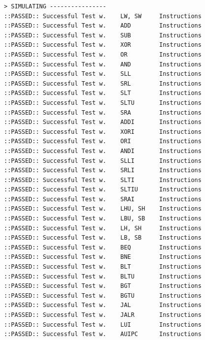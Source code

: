 \documentclass[12pt,a4paper,oneside]{book} %
\begin{document}
\begin{verbatim} 
> SIMULATING ----------------  
::PASSED:: Successful Test w.    LW, SW     Instructions
::PASSED:: Successful Test w.    ADD        Instructions
::PASSED:: Successful Test w.    SUB        Instructions
::PASSED:: Successful Test w.    XOR        Instructions
::PASSED:: Successful Test w.    OR         Instructions
::PASSED:: Successful Test w.    AND        Instructions
::PASSED:: Successful Test w.    SLL        Instructions
::PASSED:: Successful Test w.    SRL        Instructions
::PASSED:: Successful Test w.    SLT        Instructions
::PASSED:: Successful Test w.    SLTU       Instructions
::PASSED:: Successful Test w.    SRA        Instructions
::PASSED:: Successful Test w.    ADDI       Instructions
::PASSED:: Successful Test w.    XORI       Instructions
::PASSED:: Successful Test w.    ORI        Instructions
::PASSED:: Successful Test w.    ANDI       Instructions
::PASSED:: Successful Test w.    SLLI       Instructions
::PASSED:: Successful Test w.    SRLI       Instructions
::PASSED:: Successful Test w.    SLTI       Instructions
::PASSED:: Successful Test w.    SLTIU      Instructions
::PASSED:: Successful Test w.    SRAI       Instructions
::PASSED:: Successful Test w.    LHU, SH    Instructions
::PASSED:: Successful Test w.    LBU, SB    Instructions
::PASSED:: Successful Test w.    LH, SH     Instructions
::PASSED:: Successful Test w.    LB, SB     Instructions
::PASSED:: Successful Test w.    BEQ        Instructions
::PASSED:: Successful Test w.    BNE        Instructions
::PASSED:: Successful Test w.    BLT        Instructions
::PASSED:: Successful Test w.    BLTU       Instructions
::PASSED:: Successful Test w.    BGT        Instructions
::PASSED:: Successful Test w.    BGTU       Instructions
::PASSED:: Successful Test w.    JAL        Instructions
::PASSED:: Successful Test w.    JALR       Instructions
::PASSED:: Successful Test w.    LUI        Instructions
::PASSED:: Successful Test w.    AUIPC      Instructions
\end{verbatim}
\end{document}
